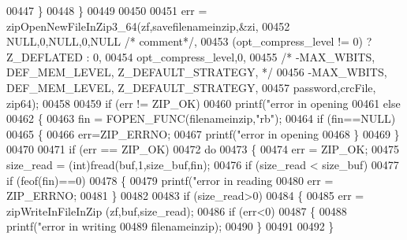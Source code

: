 \begin{DoxyCode}
{{{{{{{00447                      \}
00448                  \}
00449 
00450                  
00451                 err = zipOpenNewFileInZip3\_64(zf,savefilenameinzip,&zi,
00452                                  NULL,0,NULL,0,NULL \textcolor{comment}{/* comment*/},
00453                                  (opt\_compress\_level != 0) ? Z\_DEFLATED : 0,
00454                                  opt\_compress\_level,0,
00455                                  \textcolor{comment}{/* -MAX\_WBITS, DEF\_MEM\_LEVEL, Z\_DEFAULT\_STRATEGY, */}
00456                                  -MAX\_WBITS, DEF\_MEM\_LEVEL, Z\_DEFAULT\_STRATEGY,
00457                                  password,crcFile, zip64);
00458 
00459                 \textcolor{keywordflow}{if} (err != ZIP\_OK)
00460                     printf(\textcolor{stringliteral}{"error in opening %
00461                 \textcolor{keywordflow}{else}
00462                 \{
00463                     fin = FOPEN\_FUNC(filenameinzip,\textcolor{stringliteral}{"rb"});
00464                     \textcolor{keywordflow}{if} (fin==NULL)
00465                     \{
00466                         err=ZIP\_ERRNO;
00467                         printf(\textcolor{stringliteral}{"error in opening %
00468                     \}
00469                 \}
00470 
00471                 \textcolor{keywordflow}{if} (err == ZIP\_OK)
00472                     \textcolor{keywordflow}{do}
00473                     \{
00474                         err = ZIP\_OK;
00475                         size\_read = (int)fread(buf,1,size\_buf,fin);
00476                         \textcolor{keywordflow}{if} (size\_read < size\_buf)
00477                             \textcolor{keywordflow}{if} (feof(fin)==0)
00478                         \{
00479                             printf(\textcolor{stringliteral}{"error in reading %
00480                             err = ZIP\_ERRNO;
00481                         \}
00482 
00483                         \textcolor{keywordflow}{if} (size\_read>0)
00484                         \{
00485                             err = zipWriteInFileInZip (zf,buf,size\_read);
00486                             \textcolor{keywordflow}{if} (err<0)
00487                             \{
00488                                 printf(\textcolor{stringliteral}{"error in writing %
00489                                                  filenameinzip);
00490                             \}
00491 
00492                         \}
}}}}}}}}}}}
\end{DoxyCode}
